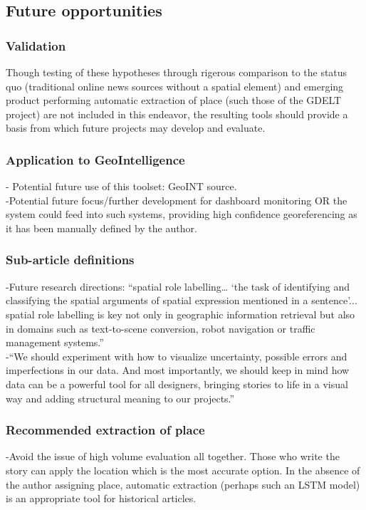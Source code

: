 \subsection{Future opportunities}
\subsubsection{Validation}
Though testing of these hypotheses through rigerous comparison to the status quo (traditional online news sources without a spatial element) and emerging product performing automatic extraction of place (such those of the GDELT project) are not included in this endeavor, the resulting tools should provide a basis from which future projects may develop and evaluate.

\subsubsection{Application to GeoIntelligence}
-{\color{purple} Potential future use of this toolset: GeoINT source.\cite{Datta2018}}\\
-{\color{purple}Potential future focus/further development for dashboard monitoring OR the system could feed into such systems, providing high confidence georeferencing as it has been manually defined by the author.\cite{Teitler2008}}\\

\subsubsection{Sub-article definitions}
-{\color{orange}Future research directions: “spatial role labelling… ‘the task of identifying and classifying the spatial arguments of spatial expression mentioned in a sentence’... spatial role labelling is key not only in geographic information retrieval but also in domains such as text-to-scene conversion, robot navigation or traffic management systems.”\cite{Karimzadeh2019}}\\
-{\color{orange}“We should experiment with how to visualize uncertainty, possible errors and imperfections in our data. And most importantly, we should keep in mind how data can be a powerful tool for all designers, bringing stories to life in a visual way and adding structural meaning to our projects.”\cite{Lupi2017}}\\

\subsubsection{Recommended extraction of place}
-{\color{purple}Avoid the issue of high volume evaluation all together. Those who write the story can apply the location which is the most accurate option. In the absence of the author assigning place, automatic extraction (perhaps such an LSTM model) is an appropriate tool for historical articles.\cite{Halterman2019}}\\

